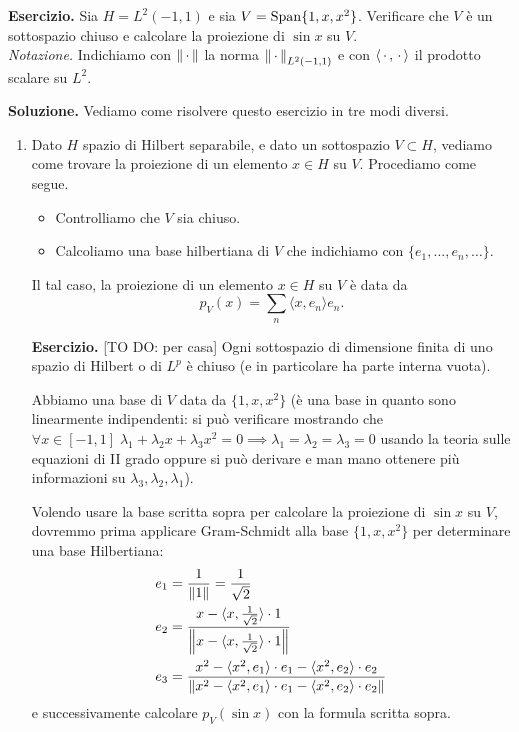 %
%



\textbf{Esercizio.}
Sia $H = L^2(-1, 1)$ e sia $V = \operatorname{Span}\{ 1, x, x^2 \}$. Verificare che $V$ è un sottospazio chiuso e calcolare la proiezione di $\sin x$ su $V$. \\
\textit{Notazione.} Indichiamo con $\left\lVert \,\cdot\, \right\rVert$ la norma $\left\lVert \,\cdot\, \right\rVert_{L^2(-1, 1)}$ e con $\langle \,\cdot\,, \,\cdot\, \rangle$ il prodotto scalare su $L^2$.

\textbf{Soluzione.}
Vediamo come risolvere questo esercizio in tre modi diversi.

\begin{enumerate}

\item Dato $H$ spazio di Hilbert separabile, e dato un sottospazio $V \subset H$, vediamo come trovare la proiezione di un elemento $x \in H$ su $V$. Procediamo come segue.
\begin{itemize}
	\item Controlliamo che $V$ sia chiuso.

	\item Calcoliamo una base hilbertiana di $V$ che indichiamo con $\{ e_1, \dots, e_n, \dots \}$. 
\end{itemize}
Il tal caso, la proiezione di un elemento $x \in H$  su $V$ è data da
$$
	p_V(x) = \sum_n \langle x, e_n \rangle e_n.
$$

\textbf{Esercizio.} [TO DO: per casa] Ogni sottospazio di dimensione finita  di uno spazio di Hilbert o di $L^p$ è chiuso (e in particolare ha parte interna vuota).

Abbiamo una base di $V$ data da $\{1, x, x^2\}$ (è una base in quanto sono linearmente indipendenti: si può verificare mostrando che $\forall x \in [-1, 1] \; \lambda_1 + \lambda_2 x + \lambda_3 x^2 = 0 \implies \lambda_1 = \lambda_2 = \lambda_3 = 0$ usando la teoria sulle equazioni di II grado oppure si può derivare e man mano ottenere più informazioni su $\lambda_3, \lambda_2, \lambda_1$).

Volendo usare la base scritta sopra per calcolare la proiezione di $\sin x$ su $V$, dovremmo prima applicare Gram-Schmidt alla base $\{1,x,x^2\}$ per determinare una base Hilbertiana:
$$
\begin{aligned}
	e_1 &= \frac{1}{\left\lVert 1 \right\rVert} = \frac{1}{\sqrt{2}} \\
	e_2 &= \frac{x - \langle x, \frac{1}{\sqrt 2} \rangle \cdot 1}{\left\lVert x - \langle x, \frac{1}{\sqrt 2} \rangle \cdot 1 \right\rVert} \\
	e_3 &= \frac{x^2 - \langle x^2, e_1 \rangle \cdot e_1 - \langle x^2, e_2 \rangle \cdot e_2}{\left\lVert x^2 - \langle x^2, e_1 \rangle \cdot e_1 - \langle x^2, e_2 \rangle \cdot e_2 \right\rVert} \\
\end{aligned}
$$
e successivamente calcolare $p_V(\sin x)$ con la formula scritta sopra.


\end{enumerate}
